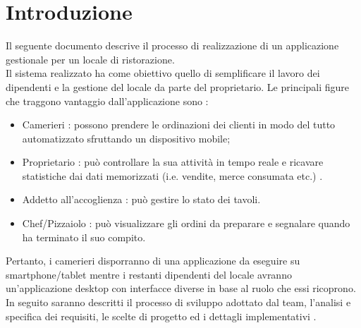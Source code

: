 \chapter{Introduzione}
Il seguente documento descrive il processo di realizzazione di un applicazione gestionale per un locale di ristorazione. 
\\Il sistema realizzato ha come obiettivo quello di semplificare il lavoro dei dipendenti e la gestione del locale da parte del proprietario. 
Le principali figure che traggono vantaggio dall'applicazione sono :
\begin{itemize}
	\item Camerieri : possono prendere le ordinazioni dei clienti in modo del tutto automatizzato sfruttando un dispositivo mobile;
	\item Proprietario : può controllare la sua attività in tempo reale e ricavare statistiche dai dati memorizzati (i.e. vendite, merce consumata etc.) .
	\item Addetto all'accoglienza : può gestire lo stato dei tavoli.
	\item Chef/Pizzaiolo : può visualizzare gli ordini da preparare e segnalare quando ha terminato il suo compito.
\end{itemize}
Pertanto, i camerieri disporranno di una applicazione da eseguire su smartphone/tablet mentre i restanti dipendenti del locale avranno un'applicazione desktop con interfacce diverse in base al ruolo che essi ricoprono.
In seguito saranno descritti il processo di sviluppo adottato dal team, l'analisi e specifica dei requisiti, le scelte di progetto ed i dettagli implementativi .
